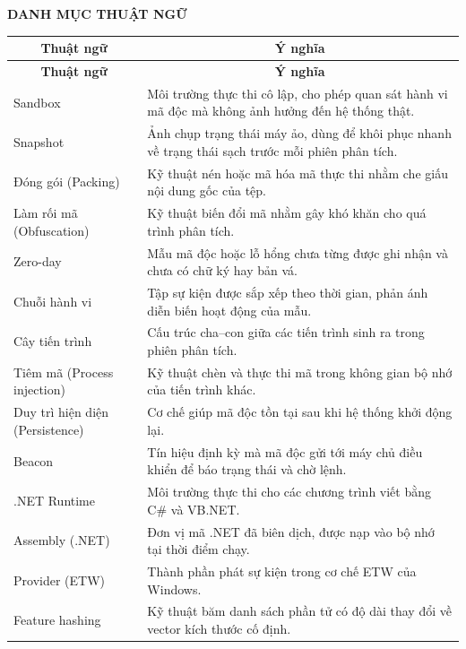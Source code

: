 \documentclass[../DoAn.tex]{subfiles}
\begin{document}
\begin{center}
    \Large{\textbf{DANH MỤC THUẬT NGỮ}}\\
\end{center}
\vspace{0.5cm}

\begin{longtable}{|p{3.8cm}|p{10cm}|}
\hline
\multicolumn{1}{|c|}{\textbf{Thuật ngữ}} & \multicolumn{1}{c|}{\textbf{Ý nghĩa}} \\
\hline
\endfirsthead
\hline
\multicolumn{1}{|c|}{\textbf{Thuật ngữ}} & \multicolumn{1}{c|}{\textbf{Ý nghĩa}} \\
\hline
\endhead
\endfoot
\endlastfoot
Sandbox & Môi trường thực thi cô lập, cho phép quan sát hành vi mã độc mà không ảnh hưởng đến hệ thống thật. \\
\hline
Snapshot & Ảnh chụp trạng thái máy ảo, dùng để khôi phục nhanh về trạng thái sạch trước mỗi phiên phân tích. \\
\hline
Đóng gói (Packing) & Kỹ thuật nén hoặc mã hóa mã thực thi nhằm che giấu nội dung gốc của tệp. \\
\hline
Làm rối mã (Obfuscation) & Kỹ thuật biến đổi mã nhằm gây khó khăn cho quá trình phân tích. \\
\hline
Zero-day & Mẫu mã độc hoặc lỗ hổng chưa từng được ghi nhận và chưa có chữ ký hay bản vá. \\
\hline
Chuỗi hành vi & Tập sự kiện được sắp xếp theo thời gian, phản ánh diễn biến hoạt động của mẫu. \\
\hline
Cây tiến trình & Cấu trúc cha--con giữa các tiến trình sinh ra trong phiên phân tích. \\
\hline
Tiêm mã (Process injection) & Kỹ thuật chèn và thực thi mã trong không gian bộ nhớ của tiến trình khác. \\
\hline
Duy trì hiện diện (Persistence) & Cơ chế giúp mã độc tồn tại sau khi hệ thống khởi động lại. \\
\hline
Beacon & Tín hiệu định kỳ mà mã độc gửi tới máy chủ điều khiển để báo trạng thái và chờ lệnh. \\
\hline
.NET Runtime & Môi trường thực thi cho các chương trình viết bằng C\# và VB.NET. \\
\hline
Assembly (.NET) & Đơn vị mã .NET đã biên dịch, được nạp vào bộ nhớ tại thời điểm chạy. \\
\hline
Provider (ETW) & Thành phần phát sự kiện trong cơ chế ETW của Windows. \\
\hline
Feature hashing & Kỹ thuật băm danh sách phần tử có độ dài thay đổi về vector kích thước cố định. \\

\end{longtable}
\end{document}
